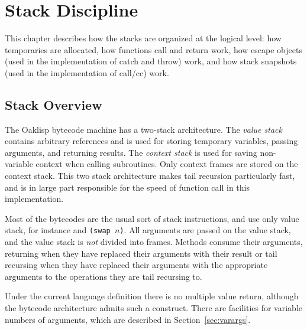 %
%
%


\chapter{Stack Discipline}

This chapter describes how the stacks are organized at the logical
level: how temporaries are allocated, how functions call and return
work, how escape objects (used in the implementation of catch and
throw) work, and how stack snapshots (used in the implementation of
call/cc) work.

\section{Stack Overview}

The Oaklisp bytecode machine has a two-stack architecture.  The
\emph{value stack} contains arbitrary references and is used for storing
temporary variables, passing arguments, and returning results.  The
\emph{context stack} is used for saving non-variable context when
calling subroutines.  Only context frames are stored on the context
stack.  This two stack architecture makes tail recursion particularly
fast, and is in large part responsible for the speed of function call
in this implementation.

Most of the bytecodes are the usual sort of stack instructions, and
use only value stack, for instance  and \texttt{(swap
$n$)}.  All arguments are passed on the value stack,
and the value stack is \emph{not} divided into frames.  Methods consume
their arguments, returning when they have replaced their arguments
with their result or tail recursing when they have replaced their
arguments with the appropriate arguments to the operations they are
tail recursing to.

Under the current language definition there is no multiple value
return, although the bytecode architecture admits such a construct.
There are facilities for variable numbers of arguments, which are
described in Section~\ref{sec:varargs}.


